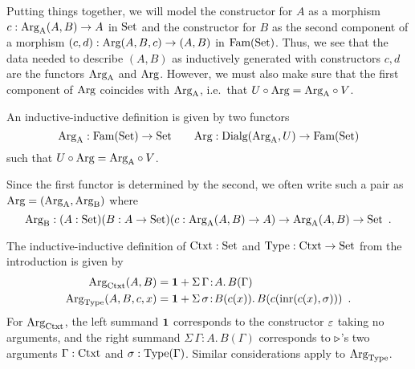 \documentclass[orivec,envcountsame, ,envcountsect]{llncs}
\begin{document}
Putting things together, we will model the constructor for $A$ as a
morphism $c : \text{Arg}_{\text{A}}(A, B) \to A$ in $\text{Set}$ and the constructor for $B$
as the second component of a morphism $(c, d) : \text{Arg}(A, B, c) \to (A,
B)$ in $\text{Fam}(\text{Set})$. Thus, we see that the data needed to describe $(A,
B)$ as inductively generated with constructors $c, d$ are
the functors $\text{Arg}_{\text{A}}$ and $\text{Arg}$. However, we must also make sure that
the first component of $\text{Arg}$ coincides with $\text{Arg}_{\text{A}}$, i.e.\ that
$U \circ \text{Arg} = \text{Arg}_{\text{A}} \circ V$.
\begin{definition} \label{def:indind-functors}
  An inductive-inductive definition is given by two functors
  \[
    \text{Arg}_{\text{A}} : \text{Fam}(\text{Set}) \to \text{Set} \qquad 
    \text{Arg} : \text{Dialg}(\text{Arg}_{\text{A}}, U) \to \text{Fam}(\text{Set})
  \]
  such that $U \circ \text{Arg} = \text{Arg}_{\text{A}} \circ V$.
\end{definition}
%
Since the first functor is determined by the second, we often write
such a pair as $\text{Arg} = (\text{Arg}_{\text{A}}, \text{Arg}_{\text{B}})$ where
\[
 \text{Arg}_{\text{B}} : (A : \text{Set})(B : A \to \text{Set})(c : \text{Arg}_{\text{A}}(A, B) \to A) \to \text{Arg}_{\text{A}}(A, B) \to \text{Set} \enspace .
 \]

\begin{example}
\label{ex:ctxtTy-functor}
The inductive-inductive definition of $\text{Ctxt} : \text{Set}$ and $\text{Type} :
\text{Ctxt} \to \text{Set}$ from the introduction is given by
\begin{align*}
  \text{Arg}_{\text{Ctxt}}(A, B) &= \mathbf{1} + \Sigma\, \Gamma\!:\!A .\, B(\Gamma)\\
  \text{Arg}_{\text{Type}}(A, B, c, x) &= \mathbf{1} + \Sigma\,  \sigma\!:\! B(c(x)).\, B(c(\text{inr}(c(x), \sigma))) \enspace .
\end{align*}
For $\text{Arg}_{\text{Ctxt}}$, the left summand $\mathbf{1}$ corresponds to the constructor
$\varepsilon$ taking no arguments, and the right summand $\Sigma\,
\Gamma\!:\!A .\, B(\Gamma)$ corresponds to $ \triangleright $'s two
arguments $\Gamma : \text{Ctxt}$ and $\sigma : \text{Type}(\Gamma)$. Similar
considerations apply to $\text{Arg}_{\text{Type}}$.

\end{example}
\end{document}
